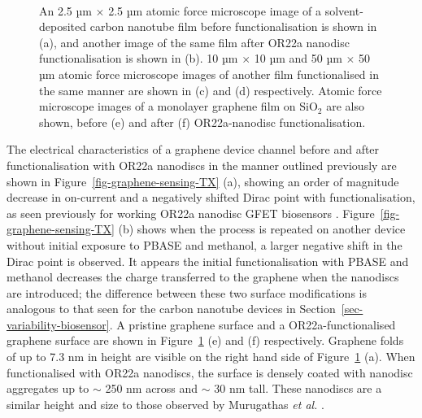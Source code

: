 \documentclass[
  a4paper,
]{scrbook}
\begin{document}
\begin{figure}
\begin{minipage}[t]{0.01\linewidth}
{\centering 

~

}

\end{minipage}%

\caption{\label{fig-solvent-deposited-AFM-comparison}An 2.5 µm
\(\times\) 2.5 µm atomic force microscope image of a solvent-deposited
carbon nanotube film before functionalisation is shown in (a), and
another image of the same film after OR22a nanodisc functionalisation is
shown in (b). 10 µm \(\times\) 10 µm and 50 µm \(\times\) 50 µm atomic
force microscope images of another film functionalised in the same
manner are shown in (c) and (d) respectively. Atomic force microscope
images of a monolayer graphene film on SiO\(_2\) are also shown, before
(e) and after (f) OR22a-nanodisc functionalisation.}

\end{figure}

The electrical characteristics of a graphene device channel before and
after functionalisation with OR22a nanodiscs in the manner outlined
previously are shown in Figure~\ref{fig-graphene-sensing-TX} (a),
showing an order of magnitude decrease in on-current and a negatively
shifted Dirac point with functionalisation, as seen previously for
working OR22a nanodisc GFET biosensors \autocite{Murugathas2020}.
Figure~\ref{fig-graphene-sensing-TX} (b) shows when the process is
repeated on another device without initial exposure to PBASE and
methanol, a larger negative shift in the Dirac point is observed. It
appears the initial functionalisation with PBASE and methanol decreases
the charge transferred to the graphene when the nanodiscs are
introduced; the difference between these two surface modifications is
analogous to that seen for the carbon nanotube devices in
Section~\ref{sec-variability-biosensor}. A pristine graphene surface and
a OR22a-functionalised graphene surface are shown in
Figure~\ref{fig-solvent-deposited-AFM-comparison} (e) and (f)
respectively. Graphene folds of up to 7.3 nm in height are visible on
the right hand side of Figure~\ref{fig-solvent-deposited-AFM-comparison}
(a). When functionalised with OR22a nanodiscs, the surface is densely
coated with nanodisc aggregates up to \(\sim\) 250 nm across and
\(\sim\) 30 nm tall. These nanodiscs are a similar height and size to
those observed by Murugathas \emph{et al.} \autocite{Murugathas2020}.
\end{document}
